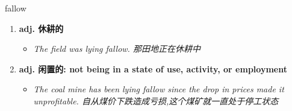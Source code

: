 
\begin{frame}
{\huge fallow}
\begin{center}
\begin{enumerate}\Large
  \item \textbf{adj. 休耕的}
  \begin{itemize}
    \item \em{\Large{The field was lying fallow. 那田地正在休耕中}}
  \end{itemize}
  \item \textbf{adj. 闲置的: not being in a state of use, activity, or employment}
  \begin{itemize}
    \item \em{\Large{The coal mine has been lying fallow since the drop in prices made it unprofitable. 自从煤价下跌造成亏损,这个煤矿就一直处于停工状态}}
  \end{itemize}
\end{enumerate}
\end{center}
\end{frame}
